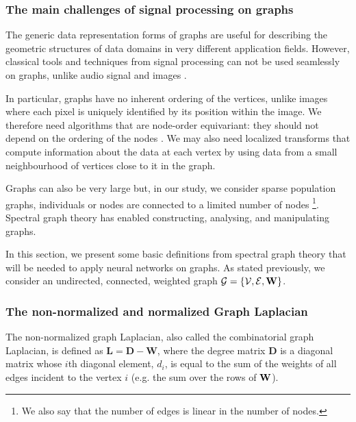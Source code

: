 \subsubsection{The main challenges of signal processing on graphs} 

The generic data representation forms of graphs are useful for describing the geometric structures of data domains in very different application fields.
However, classical tools and techniques from signal processing can not be used seamlessly on graphs, unlike audio signal and images \cite{shuman_emerging_2013}.

In particular, graphs have no inherent ordering of the vertices, unlike images where each pixel is uniquely identified by its position within the image. We therefore need algorithms that are node-order equivariant: they should not depend on the ordering of the nodes \cite{daigavane_understanding_2021}. We may also need localized transforms that compute information about the data at each vertex by using data from a small neighbourhood of vertices close to it in the graph.

Graphs can also be very large but, in our study, we consider sparse population graphs, \ie individuals or nodes are connected to a limited number of nodes \footnote{We also say that the number of edges is linear in the number of nodes.}.
Spectral graph theory has enabled constructing, analysing, and manipulating graphs.


In this section, we present some basic definitions from spectral graph theory that will be needed to apply neural networks on graphs. As stated previously, we consider an undirected, connected, weighted graph $\mathcal{G} = \{\mathcal{V}, \mathcal{E}, \mathbf{W}\}$. 

\subsubsection{The non-normalized and normalized Graph Laplacian}

The non-normalized graph Laplacian, also called the combinatorial graph Laplacian, is defined 
as $\mathbf{L} = \mathbf{D}-\mathbf{W}$, where the degree matrix $\mathbf{D}$ 
is a diagonal matrix 
whose $i$th diagonal element, $d_i$, is equal to the sum of the weights of all edges incident to the vertex $i$
(e.g. the sum over the rows of $\mathbf{W}$).

